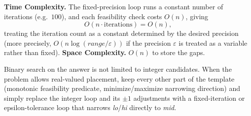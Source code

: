 \begin{complexitybox}
\textbf{Time Complexity.} The fixed-precision loop runs a constant number
of iterations (e.g.\ $100$), and each feasibility check costs $O(n)$,
giving
\[
  O(n \cdot \text{iterations}) = O(n),
\]
treating the iteration count as a constant determined by the desired
precision (more precisely, $O(n \log(\textit{range}/\varepsilon))$ if the
precision $\varepsilon$ is treated as a variable rather than fixed).
\textbf{Space Complexity.} $O(n)$ to store the gaps.
\end{complexitybox}

\begin{takeawaybox}
Binary search on the answer is not limited to integer candidates. When the
problem allows real-valued placement, keep every other part of the
template (monotonic feasibility predicate, minimize/maximize narrowing
direction) and simply replace the integer loop and its $\pm 1$ adjustments
with a fixed-iteration or epsilon-tolerance loop that narrows
\textit{lo}/\textit{hi} directly to \textit{mid}.
\end{takeawaybox}
